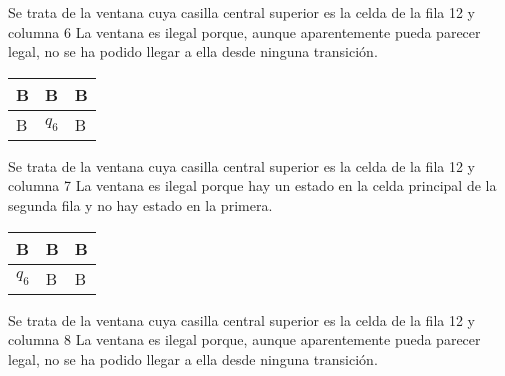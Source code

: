 ﻿\documentclass[a4paper,10pt]{article}
\begin{document}
Se trata de la ventana cuya casilla central superior es la celda de la fila 12 y columna 6\newline
La ventana es ilegal porque, aunque aparentemente pueda parecer legal, no se ha podido llegar a ella desde ninguna transición.\newline
\begin{table}[h!]
\centering
\begin{tabular}{|l|l|l|}
\hline
	B   &   B   &   B	\\ \hline
	B   &   $q_6$  &   B	\\ \hline
\end{tabular}
\end{table}

Se trata de la ventana cuya casilla central superior es la celda de la fila 12 y columna 7\newline
La ventana es ilegal porque hay un estado en la celda principal de la segunda fila y no hay estado en la primera.\newline
\begin{table}[h!]
\centering
\begin{tabular}{|l|l|l|}
\hline
	B   &   B   &   B	\\ \hline
	$q_6$  &   B   &   B	\\ \hline
\end{tabular}
\end{table}

Se trata de la ventana cuya casilla central superior es la celda de la fila 12 y columna 8\newline
La ventana es ilegal porque, aunque aparentemente pueda parecer legal, no se ha podido llegar a ella desde ninguna transición.\newline
\end{document}
